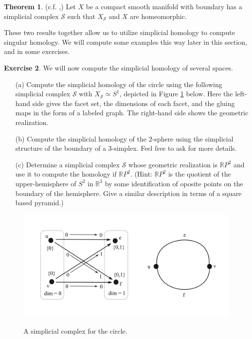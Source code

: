 \documentclass[12pt]{article}
\theoremstyle{definition}
\newtheorem{theorem}{Theorem}[section]
\newtheorem{exercise}[theorem]{Exercise}
\numberwithin{equation}{section}
\newcommand{\R}{{\mathbb R}}
\begin{document}
\begin{theorem} (c.f. \cite{cairns1935},\cite{whitehead1940}) Let $X$ be a compact smooth manifold with boundary has a simplicial complex $\mathcal{S}$ such that $X_{\mathcal{S}}$ and $X$ are homeomorphic.
\end{theorem}

These two results together allow us to utilize simplicial homology to compute singular homology. We will compute some examples this way later in this section, and in some exercises.

\begin{exercise} We will now compute the simplicial homology of several spaces.
\begin{itemize}
	\item[(a)] Compute the simplicial homology of the circle using the following simplicial complex $\mathcal{S}$ with $X_{\mathcal{S}} \simeq S^1$, depicted in Figure \ref{fig:simplicial_circle} below. Here the left-hand side gives the facet set, the dimensions of each facet, and the gluing maps in the form of a labeled graph. The right-hand side shows the geometric realization.
	\item[(b)] Compute the simplicial homology of the $2$-sphere using the simplicial structure of the boundary of a $3$-simplex. Feel free to ask for more details.
	\item[(c)] Determine a simplicial complex $\mathcal{S}$ whose geometric realization is $\R P^2$ and use it to compute the homology if $\R P^2$. (Hint: $\R P^2$ is the quotient of the upper-hemisphere of $S^2$ in $\R^3$ by some identification of oposite points on the boundary of the hemisphere. Give a similar description in terms of a square based pyramid.)
\end{itemize}
\end{exercise}

	\begin{figure}[h]
    \centering
    \includegraphics[width=1\textwidth]{reu_figures/circle_simplicial.png}
    \label{fig:simplicial_circle}
    \caption{A simplicial complex for the circle.}
		\end{figure}
\end{document}
